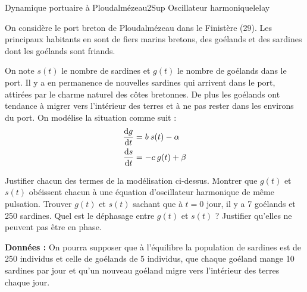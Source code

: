 

\begin{exercise}{Dynamique portuaire à Ploudalmézeau}{2}{Sup}
{Oscillateur harmonique}{lelay}

On considère le port breton de Ploudalmézeau dans le Finistère (29). Les principaux habitants en sont de fiers marins bretons, des goélands et des sardines dont les goélands sont friands.

On note $s(t)$ le nombre de sardines et $g(t)$ le nombre de goélands dans le port. Il y a en permanence de nouvelles sardines qui arrivent dans le port, attirées par le charme naturel des côtes bretonnes. De plus les goélands ont tendance à migrer vers l'intérieur des terres et à ne pas rester dans les environs du port. On modélise la situation comme suit :
\begin{align*}
    \dv{g}{t} &= b\:s(t) - \alpha \\
    \dv{s}{t} &= -c\:g(t) + \beta 
\end{align*}
\begin{questions}
    \question Justifier chacun des termes de la modélisation ci-dessus.
    \question Montrer que $g(t)$ et $s(t)$ obéissent chacun à une équation d'oscillateur harmonique de même pulsation.
    \question Trouver $g(t)$ et $s(t)$ sachant que à $t = 0$ jour, il y a 7 goélands et 250 sardines.
    \question Quel est le déphasage entre $g(t)$ et $s(t)$ ? Justifier qu'elles ne peuvent pas être en phase.
\end{questions}
\textbf{Données :} On pourra supposer que à l'équilibre la population de sardines est de 250 individus et celle de goélands de 5 individus, que chaque goéland mange 10 sardines par jour et qu'un nouveau goéland migre vers l'intérieur des terres chaque jour. 
\end{exercise}